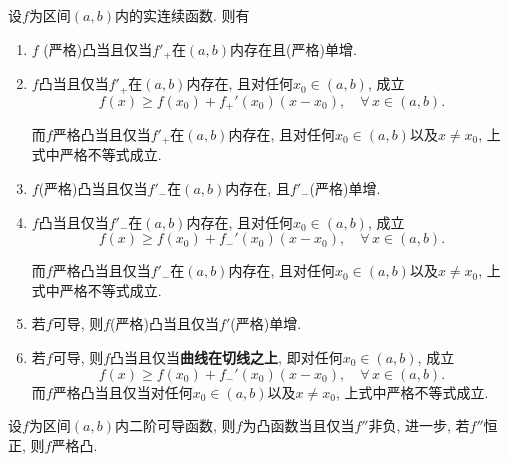 \begin{theorem}\label{C63}
设\(f\)为区间\((a,b)\)内的实连续函数. 则有
\begin{enumerate}[label=(\roman*)]
\item \(f\) (严格)凸当且仅当\(f'_+\)在\((a,b)\)内存在且(严格)单增.
\item \(f\)凸当且仅当\(f'_+\)在\((a,b)\)内存在, 且对任何\(x_0\in (a,b)\), 成立
\[f(x)\geqslant f(x_0)+f_+'(x_0)(x-x_0),\quad\forall\, x\in (a,b).\]

而\(f\)严格凸当且仅当\(f'_+\)在\((a,b)\)内存在, 且对任何\(x_0\in (a,b)\)以及\(x\ne x_0\), 上式中严格不等式成立.
\item \(f\)(严格)凸当且仅当\(f'_-\)在\((a,b)\)内存在, 且\(f'_-\)(严格)单增.
\item \(f\)凸当且仅当\(f'_-\)在\((a,b)\)内存在, 且对任何\(x_0\in (a,b)\), 成立
\[f(x)\geqslant f(x_0)+f_-'(x_0)(x-x_0),\quad\forall\, x\in (a,b).\]

而\(f\)严格凸当且仅当\(f'_-\)在\((a,b)\)内存在, 且对任何\(x_0\in (a,b)\)以及\(x\ne x_0\), 上式中严格不等式成立.
\item 若\(f\)可导, 则\(f\)(严格)凸当且仅当\(f'\)(严格)单增.
\item 若\(f\)可导, 则\(f\)凸当且仅当\textbf{曲线在切线之上}, 即对任何\(x_0\in (a,b)\), 成立
\[f(x)\geqslant f(x_0)+f_-'(x_0)(x-x_0),\quad\forall\, x\in (a,b).\]
而\(f\)严格凸当且仅当对任何\(x_0\in (a,b)\)以及\(x\ne x_0\), 上式中严格不等式成立.
\end{enumerate}
\end{theorem}
\begin{theorem}\label{C64}
设\(f\)为区间\((a,b)\)内二阶可导函数, 则\(f\)为凸函数当且仅当\(f''\)非负, 
进一步, 若\(f''\)恒正, 则\(f\)严格凸.
\end{theorem}
